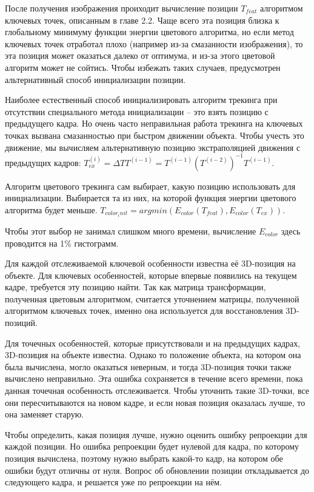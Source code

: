 После получения изображения проиходит вычисление позиции $T_{feat}$ алгоритмом
ключевых точек, описанным в главе 2.2. %
Чаще всего эта позиция близка к глобальному минимуму функции энергии цветового
алгоритма, но если метод ключевых точек отработал плохо (например из-за
смазанности изображения), то эта позиция может оказаться далеко от оптимума, и
из-за этого цветовой алгоритм может не сойтись.
Чтобы избежать таких случаев, предусмотрен альтернативный способ инициализации
позиции.

Наиболее естественный способ инициализировать алгоритм трекинга при отсутствии
специального метода инициализации -- это взять позицию с предыдущего кадра.
Но очень часто неправильная работа трекинга на ключевых точках вызвана
смазанностью при быстром движении объекта.
Чтобы учесть это движение, мы вычисляем альтернативную позицию экстраполяцией
движения с предыдущих кадров:
$
    T^{(i)}_{ex} = \Delta T T^{(i - 1)} = T^{(i - 1)}(T^{(i - 2)})^{-1} T^{(i - 1)}
$.

Алгоритм цветового трекинга сам выбирает, какую позицию использовать для
инициализации.
Выбирается та из них, на которой функция энергии цветового
алгоритма будет меньше.
$
    T_{color_init} = argmin(E_{color}(T_{feat}), E_{color}(T_{ex}))
$.

Чтобы этот выбор не занимал слишком много времени, вычисление $E_{color}$ здесь
проводится на 1\% гистограмм.

Для каждой отслеживаемой ключевой особенности известна её 3D-позиция на
объекте.
Для ключевых особенностей, которые впервые появились на текущем кадре,
требуется эту позицию найти.
Так как матрица трансформации, полученная цветовым алгоритмом, считается
уточнением матрицы, полученной алгоритмом ключевых точек, именно она
используется для восстановления 3D-позиций.


Для точечных особенностей, которые присутствовали и на предыдущих кадрах,
3D-позиция на объекте известна.
Однако то положение объекта, на котором она была вычислена, могло оказаться
неверным, и тогда 3D-позиция точки также вычислено неправильно.
Эта ошибка сохраняется в течение всего времени, пока данная точечная
особенность отслеживается.
Чтобы уточнить такие 3D-точки, все они пересчитываются на новом кадре, и если
новая позиция оказалась лучше, то она заменяет старую.

Чтобы определить, какая позиция лучше, нужно оценить ошибку репроекции для
каждой позиции.
Но ошибка репроекции будет нулевой для кадра, по которому позиция вычислена,
поэтому нужно выбрать какой-то кадр, на котором обе ошибки будут отличны от
нуля.
Вопрос об обновлении позиции откладывается до следующего кадра, и решается уже
по репроекции на нём.

